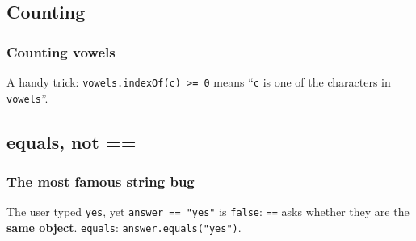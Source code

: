 \documentclass[aspectratio=169,10pt,compress]{beamer}
\begin{document}
\subsection[Count]{Counting}




\begin{frame}[t,fragile] \frametitle{Counting vowels}

  \vspace{0.3em}
  \small A handy trick: \texttt{vowels.indexOf(c) >= 0} means ``\texttt{c} is one of the characters in \texttt{vowels}''.
\end{frame}





\subsection[Equals]{equals, not ==}




\begin{frame}[t,fragile] \frametitle{The most famous string bug}

  \vspace{0.3em}
  \small The user typed \texttt{yes}, yet \texttt{answer == "yes"} is \texttt{false}: \texttt{==} asks whether they are
  the \textbf{same object}.  \texttt{equals}: \texttt{answer.equals("yes")}.
\end{frame}
\end{document}

